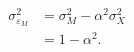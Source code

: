\begin{equation}
	\label{eq:sigma2eM}
    \begin{split}
	\sigma_{\varepsilon_{M}}^{2}
	&=
	\sigma_{M}^{2} - \alpha^2 \sigma_{X}^{2} \\
	&=
	1 - \alpha^2 .
    \end{split}
\end{equation}
